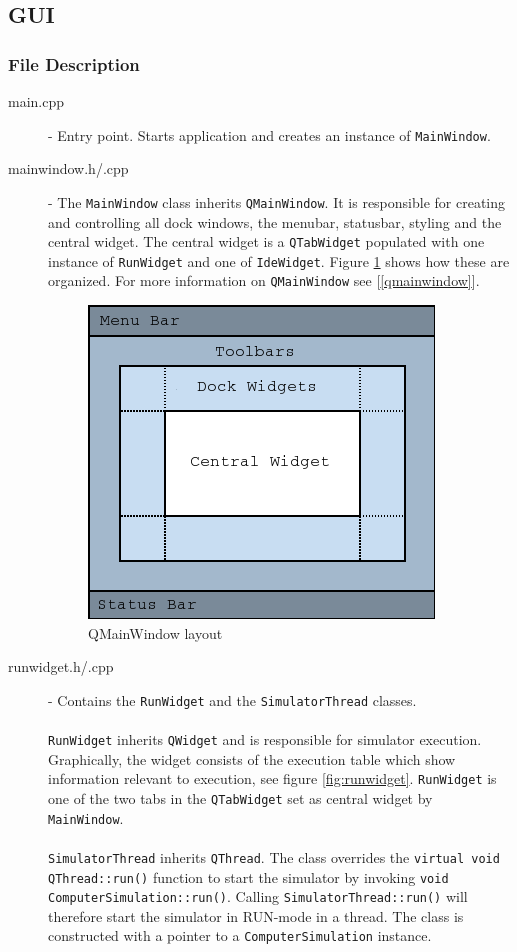 \subsection{GUI}
\subsubsection{File Description}
\begin{description}
\item[main.cpp] - Entry point. Starts application and creates an instance of \texttt{MainWindow}. 

\item [mainwindow.h/.cpp] - The \texttt{MainWindow} class inherits \texttt{QMainWindow}. It is responsible for creating and controlling all dock windows, the menubar, statusbar, styling and the central widget. The central widget is a \texttt{QTabWidget} populated with one instance of \texttt{RunWidget} and one of \texttt{IdeWidget}. Figure \ref{fig:qmainwindowlayout} shows how these are organized. For more information on \texttt{QMainWindow} see [\ref{qmainwindow}].

\begin{figure}[H]
\centering
\includegraphics[scale=0.5]{img/mainwindowlayout.png}
\caption{QMainWindow layout \cite{qt}}
\label{fig:qmainwindowlayout}
\end{figure}


\item [runwidget.h/.cpp] - Contains the \texttt{RunWidget} and the \texttt{SimulatorThread} classes. \\ \\ \texttt{RunWidget} inherits \texttt{QWidget} and is responsible for simulator execution. Graphically, the widget consists of the execution table which show information relevant to execution, see figure \ref{fig:runwidget}. \texttt{RunWidget} is one of the two tabs in the \texttt{QTabWidget} set as central widget by \texttt{MainWindow}. \\ \\
\texttt{SimulatorThread} inherits \texttt{QThread}. The class overrides the \texttt{virtual void QThread::run()} function to start the simulator by invoking \texttt{void ComputerSimulation::run()}. Calling \texttt{SimulatorThread::run()} will therefore start the simulator in RUN-mode in a thread. The class is constructed with a pointer to a \texttt{ComputerSimulation} instance.


\end{description}

